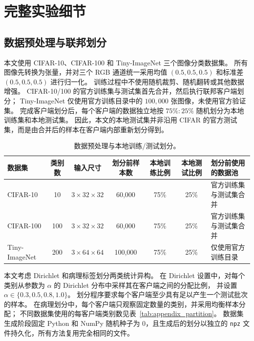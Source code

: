 
\section{完整实验细节}
\label{app:experimental_details}

\subsection{数据预处理与联邦划分}

本文使用 CIFAR-10、CIFAR-100 和 Tiny-ImageNet 三个图像分类数据集。
所有图像先转换为张量，并对三个 RGB 通道统一采用均值
$(0.5,0.5,0.5)$ 和标准差 $(0.5,0.5,0.5)$ 进行归一化。
训练过程中不使用随机裁剪、随机翻转或其他数据增强。
CIFAR-10/100 的官方训练集与测试集首先合并，然后执行联邦客户端划分；
Tiny-ImageNet 仅使用官方训练目录中的 $100{,}000$ 张图像，未使用官方验证集。
完成客户端划分后，每个客户端的数据独立地按 $75\%:25\%$ 随机划分为本地训练集和本地测试集。
因此，本文的本地测试集并非沿用 CIFAR 的官方测试集，而是由合并后的样本在客户端内部重新划分得到。

\begin{table}[t]
\centering
\caption{数据预处理与本地训练/测试划分。}
\label{tab:appendix_data_protocol}
\small
\setlength{\tabcolsep}{6pt}
\renewcommand{\arraystretch}{1.12}
\begin{tabularx}{\textwidth}{@{}lcccccX@{}}
\toprule
\textbf{数据集} & \textbf{类别数} & \textbf{输入尺寸} & \textbf{划分前样本数} & \textbf{本地训练比例} & \textbf{本地测试比例} & \textbf{划分前使用的数据池} \\
\midrule
CIFAR-10 & 10 & $3\times32\times32$ & 60,000 & 75\% & 25\% & 官方训练集与测试集合并 \\
CIFAR-100 & 100 & $3\times32\times32$ & 60,000 & 75\% & 25\% & 官方训练集与测试集合并 \\
Tiny-ImageNet & 200 & $3\times64\times64$ & 100,000 & 75\% & 25\% & 仅使用官方训练目录 \\
\bottomrule
\end{tabularx}
\end{table}

本文考虑 Dirichlet 和病理标签划分两类统计异构。
在 Dirichlet 设置中，对每个类别从参数为 $\alpha$ 的 Dirichlet 分布中采样其在客户端之间的分配比例，
并设置 $\alpha\in\{0.3,0.5,0.8,1.0\}$。
划分程序要求每个客户端至少具有足以产生一个测试批次的样本。
在病理划分中，每个客户端只观察固定数量的类别，并采用均衡样本分配；
不同数据集使用的每客户端类别数见表~\ref{tab:appendix_partition}。
数据集生成阶段固定 Python 和 NumPy 随机种子为 0，且生成后的划分以独立的
\texttt{npz} 文件持久化，所有方法复用完全相同的文件。

